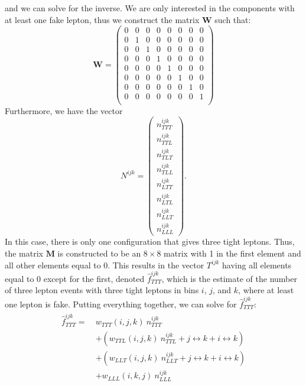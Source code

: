 and we can solve for the inverse.  
We are only interested in the components with at least one
fake lepton, thus we construct the matrix $\mathbf{W}$ such that:
\begin{equation}
\mathbf{W} = 
\begin{pmatrix}
0 & 0 & 0 & 0 & 0 & 0 & 0 & 0 \\
0 & 1 & 0 & 0 & 0 & 0 & 0 & 0 \\
0 & 0 & 1 & 0 & 0 & 0 & 0 & 0 \\
0 & 0 & 0 & 1 & 0 & 0 & 0 & 0 \\
0 & 0 & 0 & 0 & 1 & 0 & 0 & 0 \\
0 & 0 & 0 & 0 & 0 & 1 & 0 & 0 \\
0 & 0 & 0 & 0 & 0 & 0 & 1 & 0 \\
0 & 0 & 0 & 0 & 0 & 0 & 0 & 1 \\
\end{pmatrix}
\end{equation}
Furthermore, we have the vector 
\begin{equation}
N^{ijk}=\begin{pmatrix} 
  n_{TTT}^{ijk}\\
  n_{TTL}^{ijk}\\
  n_{TLT}^{ijk}\\
  n_{TLL}^{ijk}\\
  n_{LTT}^{ijk}\\
  n_{LTL}^{ijk}\\
  n_{LLT}^{ijk}\\
  n_{LLL}^{ijk}
  \end{pmatrix}.
\end{equation}
In this case, there is only one configuration that gives 
three tight leptons.  Thus, the matrix $\mathbf{M}$ is constructed
to be an $8 \times 8$ matrix with 1 in the first element and 
all other elements equal to 0. This results in the vector
$T^{ijk}$ having all elements equal to 0 except for the first,
denoted $\hat{f}_{TTT}^{ijk}$, which is the
estimate of the number of three lepton events with three tight leptons 
in bins $i$, $j$, and $k$,
where at least one lepton is fake.
Putting everything together, we can solve for 
$\hat{f}_{TTT}^{ijk}$:
\begin{align}
\begin{split}
\label{eq:mxm_threeleptons}
\hat{f}^{ijk}_{TTT} = ~& w_{TTT}(i,j,k)~n^{ijk}_{TTT}  \\
   &+(w_{TTL}(i,j,k)~n^{ijk}_{TTL} + j\leftrightarrow k + i \leftrightarrow k)\\
   &+(w_{LLT}(i,j,k)~n^{ijk}_{LLT} + j\leftrightarrow k + i \leftrightarrow k) \\
   &+w_{LLL}(i,k,j)~n^{ijk}_{LLL}
\end{split}
\end{align}
